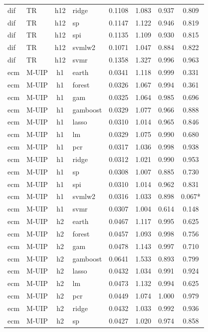 \begin{ThreePartTable}
\begin{longtable}[t]{llclcccc}
dif & TR & h12 & ridge & 0.1108 & 1.083 & 0.937 & 0.809\\
dif & TR & h12 & sp & 0.1147 & 1.122 & 0.946 & 0.819\\
dif & TR & h12 & spi & 0.1135 & 1.109 & 0.930 & 0.815\\
dif & TR & h12 & svmlw2 & 0.1071 & 1.047 & 0.884 & 0.822\\
dif & TR & h12 & svmr & 0.1358 & 1.327 & 0.996 & 0.963\\
\addlinespace
ecm & M-UIP & h1 & earth & 0.0341 & 1.118 & 0.999 & 0.331\\
ecm & M-UIP & h1 & forest & 0.0326 & 1.067 & 0.994 & 0.361\\
ecm & M-UIP & h1 & gam & 0.0325 & 1.064 & 0.985 & 0.696\\
ecm & M-UIP & h1 & gamboost & 0.0329 & 1.077 & 0.966 & 0.888\\
ecm & M-UIP & h1 & lasso & 0.0310 & 1.014 & 0.965 & 0.846\\
ecm & M-UIP & h1 & lm & 0.0329 & 1.075 & 0.990 & 0.680\\
ecm & M-UIP & h1 & pcr & 0.0317 & 1.036 & 0.998 & 0.938\\
ecm & M-UIP & h1 & ridge & 0.0312 & 1.021 & 0.990 & 0.953\\
ecm & M-UIP & h1 & sp & 0.0308 & 1.007 & 0.885 & 0.730\\
ecm & M-UIP & h1 & spi & 0.0310 & 1.014 & 0.962 & 0.831\\
ecm & M-UIP & h1 & svmlw2 & 0.0316 & 1.033 & 0.898 & 0.067*\\
ecm & M-UIP & h1 & svmr & 0.0307 & 1.004 & 0.614 & 0.148\\
\addlinespace
ecm & M-UIP & h2 & earth & 0.0467 & 1.117 & 0.995 & 0.625\\
ecm & M-UIP & h2 & forest & 0.0457 & 1.093 & 0.998 & 0.756\\
ecm & M-UIP & h2 & gam & 0.0478 & 1.143 & 0.997 & 0.710\\
ecm & M-UIP & h2 & gamboost & 0.0641 & 1.533 & 0.893 & 0.799\\
ecm & M-UIP & h2 & lasso & 0.0432 & 1.034 & 0.991 & 0.924\\
ecm & M-UIP & h2 & lm & 0.0473 & 1.132 & 0.994 & 0.625\\
ecm & M-UIP & h2 & pcr & 0.0449 & 1.074 & 1.000 & 0.979\\
ecm & M-UIP & h2 & ridge & 0.0432 & 1.033 & 0.992 & 0.936\\
ecm & M-UIP & h2 & sp & 0.0427 & 1.020 & 0.974 & 0.858\\

\end{longtable}
\end{ThreePartTable}
